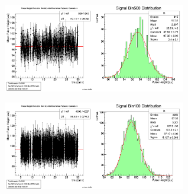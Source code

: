 \documentclass[9pt]{beamer}
\begin{document}
\begin{frame}
	\begin{center}
		\includegraphics[width=8cm]{PHEvolutionOverview500}
	\end{center}
	\begin{center}
		\includegraphics[width=8cm]{PHEvolutionOverview100}
	\end{center}
\end{frame}
\end{document}
